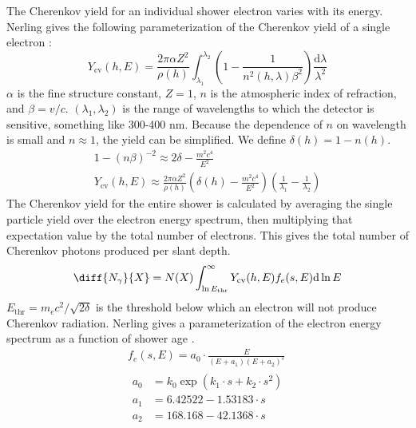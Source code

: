 The Cherenkov yield for an individual shower electron varies with its energy. Nerling gives the following parameterization of the Cherenkov yield of a single electron \cite{nerling2006electron}:
\begin{equation}
    Y_\text{cv}(h, E) = \frac{2 \pi \alpha Z^2}{\rho(h)} 
        \int^{\lambda_2}_{\lambda_1} \left(1 - \frac{1}{n^2(h, \lambda) \beta^2}\right) 
        \frac{\text{d} \lambda}{\lambda^2}
\end{equation}
$\alpha$ is the fine structure constant, $Z = 1$, $n$ is the atmospheric index of refraction, and $\beta = v / c$. $(\lambda_1, \lambda_2)$ is the range of wavelengths to which the detector is sensitive, something like 300-400 \si{nm}. Because the dependence of $n$ on wavelength is small and $n \approx 1$, the yield can be simplified. We define $\delta(h) = 1 - n(h)$.
\begin{equation}
\begin{gathered}
    1 - (n \beta)^{-2} \approx 2 \delta - \frac{m^2 c^4}{E^2} \\
    Y_\text{cv}(h, E) \approx \frac{2 \pi \alpha Z^2}{\rho(h)} 
        \left(\delta(h) - \frac{m^2 c^4}{E^2}\right)
        \left(\frac{1}{\lambda_1} - \frac{1}{\lambda_2}\right)
\end{gathered}
\end{equation}
The Cherenkov yield for the entire shower is calculated by averaging the single particle yield over the electron energy spectrum, then multiplying that expectation value by the total number of electrons. This gives the total number of Cherenkov photons produced per slant depth.
\begin{equation} \label{eq:ckv_yield}
    \diff{N_\gamma}{X} = N(X) \int^{\infty}_{\ln{E_\text{thr}}} 
        Y_\text{cv}(h, E) f_e(s, E) \text{d} \ln{E}
\end{equation}
$E_\text{thr} = m_e c^2 / \sqrt{2 \delta}$ is the threshold below which an electron will not produce Cherenkov radiation. Nerling gives a parameterization of the electron energy spectrum as a function of shower age \cite{nerling2006electron}.
\begin{gather}
    f_e(s, E) = a_0 \cdot \frac{E}{(E + a_1)(E + a_2)^s} \\
    \begin{aligned}
        a_0 &= k_0 \exp(k_1 \cdot s + k_2 \cdot s^2) \\
        a_1 &= \num{6.42522} - \num{1.53183} \cdot s \\
        a_2 &= \num{168.168} - \num{42.1368} \cdot s
    \end{aligned}
\end{gather}
